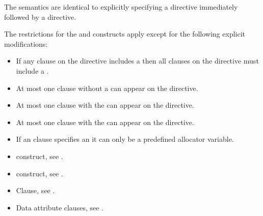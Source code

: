 \descr
The semantics are identical to explicitly specifying a  directive
immediately followed by a  directive.

\restrictions

The restrictions for the  and  constructs apply except for the following explicit modifications:

\begin{itemize}
\item If any  clause on the directive includes a
       then all  clauses
      on the directive must include a .

\item At most one  clause without a
       can appear on the directive.

\item At most one  clause with the 
       can appear on the directive.


\item At most one  clause with the 
       can appear on the directive.

\item If an  clause specifies an  it can only be a predefined allocator variable.
\end{itemize}

\crossreferences
\begin{itemize}
\item {} construct, see
.

\item {} construct, see
.

\item {} Clause, see .

\item Data attribute clauses, see
.


\end{itemize}









